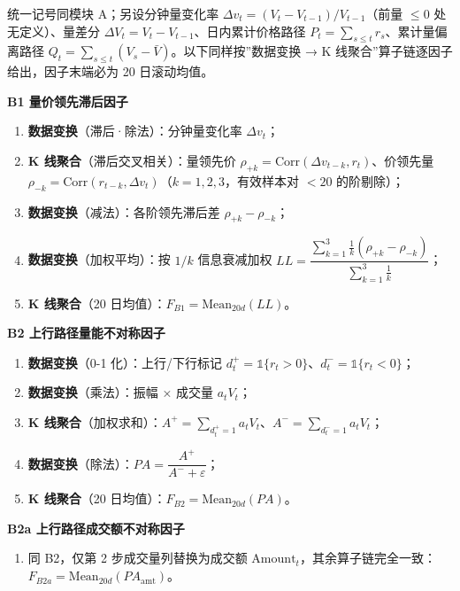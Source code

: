 \documentclass[UTF8,a4paper,zihao=-4,fontset=windows]{ctexart}
\providecommand{\tightlist}{\setlength{\itemsep}{0pt}\setlength{\parskip}{0pt}}
\begin{document}
统一记号同模块 A；另设分钟量变化率
\(\Delta v_t=(V_t-V_{t-1})/V_{t-1}\)（前量 \(\le0\) 处无定义）、量差分
\(\Delta V_t=V_t-V_{t-1}\)、日内累计价格路径
\(P_t=\sum_{s\le t}r_s\)、累计量偏离路径
\(Q_t=\sum_{s\le t}(V_s-\bar V)\)。以下同样按''数据变换 → K
线聚合''算子链逐因子给出，因子末端必为 20 日滚动均值。

\textbf{B1 量价领先滞后因子}

\begin{enumerate}
\def\labelenumi{\arabic{enumi}.}
\tightlist
\item
  \textbf{数据变换}（滞后·除法）：分钟量变化率 \(\Delta v_t\)；
\item
  \textbf{K 线聚合}（滞后交叉相关）：量领先价
  \(\rho_{+k}=\mathrm{Corr}(\Delta v_{t-k},r_t)\)、价领先量
  \(\rho_{-k}=\mathrm{Corr}(r_{t-k},\Delta v_t)\)（\(k=1,2,3\)，有效样本对
  \(<20\) 的阶剔除）；
\item
  \textbf{数据变换}（减法）：各阶领先滞后差 \(\rho_{+k}-\rho_{-k}\)；
\item
  \textbf{数据变换}（加权平均）：按 \(1/k\) 信息衰减加权
  \(LL=\dfrac{\sum_{k=1}^{3}\frac{1}{k}(\rho_{+k}-\rho_{-k})}{\sum_{k=1}^{3}\frac{1}{k}}\)；
\item
  \textbf{K 线聚合}（20 日均值）：\(F_{B1}=\mathrm{Mean}_{20d}(LL)\)。
\end{enumerate}

\textbf{B2 上行路径量能不对称因子}

\begin{enumerate}
\def\labelenumi{\arabic{enumi}.}
\tightlist
\item
  \textbf{数据变换}（0-1 化）：上行/下行标记
  \(d_t^+=\mathbb{1}\{r_t>0\}\)、\(d_t^-=\mathbb{1}\{r_t<0\}\)；
\item
  \textbf{数据变换}（乘法）：振幅 × 成交量 \(a_tV_t\)；
\item
  \textbf{K
  线聚合}（加权求和）：\(A^+=\sum_{d_t^+=1}a_tV_t\)、\(A^-=\sum_{d_t^-=1}a_tV_t\)；
\item
  \textbf{数据变换}（除法）：\(PA=\dfrac{A^+}{A^-+\varepsilon}\)；
\item
  \textbf{K 线聚合}（20 日均值）：\(F_{B2}=\mathrm{Mean}_{20d}(PA)\)。
\end{enumerate}

\textbf{B2a 上行路径成交额不对称因子}

\begin{enumerate}
\def\labelenumi{\arabic{enumi}.}
\tightlist
\item
  同 B2，仅第 2 步成交量列替换为成交额
  \(\mathrm{Amount}_t\)，其余算子链完全一致：\(F_{B2a}=\mathrm{Mean}_{20d}(PA_{\mathrm{amt}})\)。
\end{enumerate}
\end{document}
